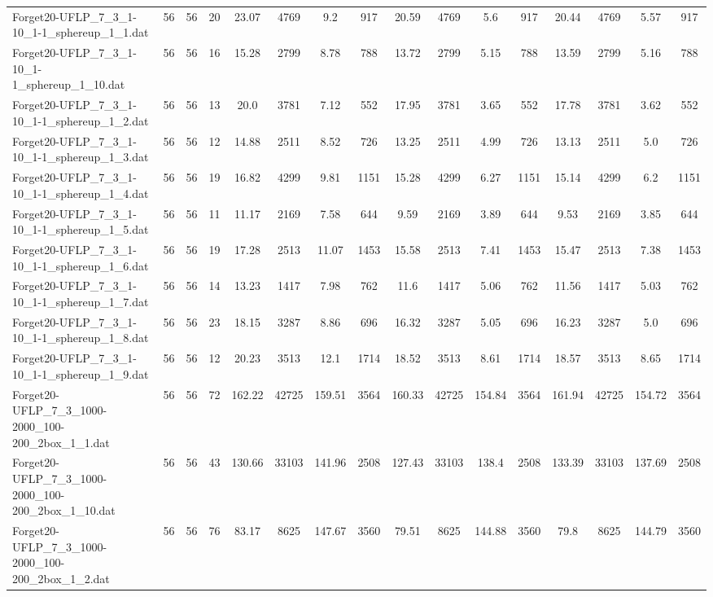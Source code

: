 \begin{sidewaystable}[!ht]
{\begin{tabular}{lccccccccccccccc}
Forget20-UFLP\_7\_3\_1-10\_1-1\_sphereup\_1\_1.dat & 56 & 56 & 20 & 23.07 & 4769 & 9.2 & 917 & 20.59 & 4769 & 5.6 & 917 & 20.44 & 4769 & 5.57 & 917 \\
Forget20-UFLP\_7\_3\_1-10\_1-1\_sphereup\_1\_10.dat & 56 & 56 & 16 & 15.28 & 2799 & 8.78 & 788 & 13.72 & 2799 & 5.15 & 788 & 13.59 & 2799 & 5.16 & 788 \\
Forget20-UFLP\_7\_3\_1-10\_1-1\_sphereup\_1\_2.dat & 56 & 56 & 13 & 20.0 & 3781 & 7.12 & 552 & 17.95 & 3781 & 3.65 & 552 & 17.78 & 3781 & 3.62 & 552 \\
Forget20-UFLP\_7\_3\_1-10\_1-1\_sphereup\_1\_3.dat & 56 & 56 & 12 & 14.88 & 2511 & 8.52 & 726 & 13.25 & 2511 & 4.99 & 726 & 13.13 & 2511 & 5.0 & 726 \\
Forget20-UFLP\_7\_3\_1-10\_1-1\_sphereup\_1\_4.dat & 56 & 56 & 19 & 16.82 & 4299 & 9.81 & 1151 & 15.28 & 4299 & 6.27 & 1151 & 15.14 & 4299 & 6.2 & 1151 \\
Forget20-UFLP\_7\_3\_1-10\_1-1\_sphereup\_1\_5.dat & 56 & 56 & 11 & 11.17 & 2169 & 7.58 & 644 & 9.59 & 2169 & 3.89 & 644 & 9.53 & 2169 &  \textcolor{blue2}{3.85} & 644 \\
Forget20-UFLP\_7\_3\_1-10\_1-1\_sphereup\_1\_6.dat & 56 & 56 & 19 & 17.28 & 2513 & 11.07 & 1453 & 15.58 & 2513 & 7.41 & 1453 & 15.47 & 2513 & 7.38 & 1453 \\
Forget20-UFLP\_7\_3\_1-10\_1-1\_sphereup\_1\_7.dat & 56 & 56 & 14 & 13.23 & 1417 & 7.98 & 762 & 11.6 & 1417 & 5.06 & 762 & 11.56 & 1417 & 5.03 & 762 \\
Forget20-UFLP\_7\_3\_1-10\_1-1\_sphereup\_1\_8.dat & 56 & 56 & 23 & 18.15 & 3287 & 8.86 & 696 & 16.32 & 3287 & 5.05 & 696 & 16.23 & 3287 & 5.0 & 696 \\
Forget20-UFLP\_7\_3\_1-10\_1-1\_sphereup\_1\_9.dat & 56 & 56 & 12 & 20.23 & 3513 & 12.1 & 1714 & 18.52 & 3513 & 8.61 & 1714 & 18.57 & 3513 & 8.65 & 1714 \\
Forget20-UFLP\_7\_3\_1000-2000\_100-200\_2box\_1\_1.dat & 56 & 56 & 72 & 162.22 & 42725 & 159.51 & 3564 & 160.33 & 42725 & 154.84 & 3564 & 161.94 & 42725 & 154.72 & 3564 \\
Forget20-UFLP\_7\_3\_1000-2000\_100-200\_2box\_1\_10.dat & 56 & 56 & 43 & 130.66 & 33103 & 141.96 & 2508 & 127.43 & 33103 & 138.4 & 2508 & 133.39 & 33103 & 137.69 & 2508 \\
Forget20-UFLP\_7\_3\_1000-2000\_100-200\_2box\_1\_2.dat & 56 & 56 & 76 & 83.17 & 8625 & 147.67 & 3560 &  \textcolor{blue2}{79.51} & 8625 & 144.88 & 3560 & 79.8 & 8625 & 144.79 & 3560 \\

\end{tabular}}
\end{sidewaystable}
